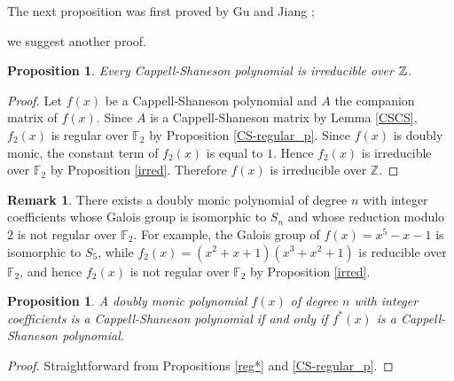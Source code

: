 \documentclass{amsart}
\theoremstyle{plain}
\newtheorem{cor}[thm]{Corollary}
\newtheorem{prop}[thm]{Proposition}
\theoremstyle{definition}
\newtheorem{rem}[thm]{Remark}
\theoremstyle{remark}
\newcommand{\cb}{}
\begin{document}


The next proposition was first proved by Gu and Jiang \cite[Theorem 3.2]{GJ1999};
{\cb
we suggest another proof.

\begin{prop}
Every Cappell-Shaneson polynomial is irreducible over $\mathbb Z$.
\end{prop}
}
\begin{proof}
Let $f(x)$ be a Cappell-Shaneson polynomial and $A$ the companion matrix of $f(x)$. 
Since $A$ is a Cappell-Shaneson matrix by Lemma \ref{CSCS}, 
$f_2(x)$ is regular over $\mathbb{F}_2$ by Proposition \ref{CS-regular_p}. 
Since $f(x)$ is doubly monic, the constant term of $f_2(x)$ is equal to $1$. 
Hence $f_2(x)$ is irreducible over $\mathbb{F}_2$ by Proposition \ref{irred}. 
Therefore $f(x)$ is irreducible over
{\cb
$\mathbb{Z}$.}
\end{proof}

\begin{rem}
There exists a doubly monic polynomial of degree $n$ with integer coefficients whose Galois group 
is isomorphic to $S_n$ and whose reduction modulo $2$ is not regular over $\mathbb{F}_2$. 
For example, the Galois group of $f(x)=x^5-x-1$ is isomorphic to $S_5$, while 
$f_2(x)=(x^2+x+1)(x^3+x^2+1)$ is reducible over $\mathbb{F}_2$, and hence $f_2(x)$ is not regular 
over $\mathbb{F}_2$ by Proposition \ref{irred}. 
\end{rem}

\begin{prop}\label{CSdual}
A doubly monic polynomial $f(x)$ of degree $n$ with integer coefficients is 
a Cappell-Shaneson polynomial if and only if $f^*(x)$ is a Cappell-Shaneson polynomial. 
\end{prop}

\begin{proof}
Straightforward from Propositions \ref{reg*} and \ref{CS-regular_p}. 
\end{proof}
\end{document}
